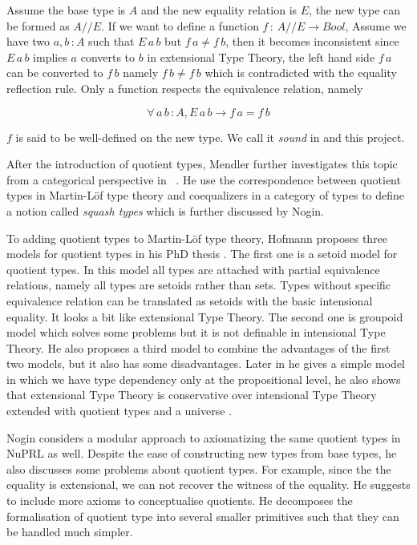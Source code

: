 \documentclass{article}
\theoremstyle{definition}
\newcommand{\itt}{intensional Type Theory}
\newcommand{\ett}{extensional Type Theory}
\newcommand{\mltt}{Martin-L\"{o}f type theory}
\begin{document}
Assume the base type is $A$ and the new equality relation is $E$, the new
type can be formed as $A//E$. If we want to define a function $f
\,\colon\, A//E \to Bool$,  Assume we have two $a, b \,\colon A$ such that $E\,a\,b$ but $f\,a \not= f\,b$, then it
becomes inconsistent since $E\,a\,b$ implies $a$ converts to $b$ in \ett{}, the left
hand side $f\,a$ can be converted to $f\,b$ namely $f\,b \not= f\,b$
which is contradicted with the equality reflection rule. Only a function respects the equivalence
relation, namely

$$\forall \, a\,b\,\colon A, E\,a\,b \to f\,a = f\,b$$

$f$ is said to be well-defined on the new type. We call it \emph{sound} in
\cite{aan} and this project.

 After the introduction of quotient types, Mendler further investigates
 this topic from a categorical perspective in ~\cite{men:90}. He use
 the correspondence between quotient types in \mltt{} and coequalizers
 in a category of types to define a notion called \emph{squash types}
 which is further discussed by Nogin.


To adding quotient types to \mltt{}, Hofmann proposes  three models for
quotient types in his PhD thesis \cite{hof:phd}. The first one is a setoid model for
quotient types. In this model all types are attached with partial
equivalence relations, namely all types are setoids rather than
sets. Types without specific equivalence relation can be translated as
setoids with the basic intensional equality. It looks a bit like
\ett{}. The second one is groupoid model which solves some problems
but it is not definable in \itt{}. He also proposes a third model to
combine the advantages of the first two models, but it also has some
disadvantages. Later in \cite{hof:95:sm} he gives a simple model in which we have type dependency only at the propositional level, he also shows that extensional Type Theory is conservative over \itt {}  extended with quotient types and a universe \cite{hof:95:con}.

Nogin \cite{nog:02} considers a modular approach to axiomatizing the
same quotient types in NuPRL as well. Despite the ease of constructing new types
from base types, he also discusses some
problems about quotient types. For example, since the the equality is
extensional, we can not recover the
witness of the equality.  He suggests to include more axioms to
conceptualise quotients. He decomposes the formalisation of quotient type
into several smaller primitives such that they can be handled much
simpler.
\end{document}
